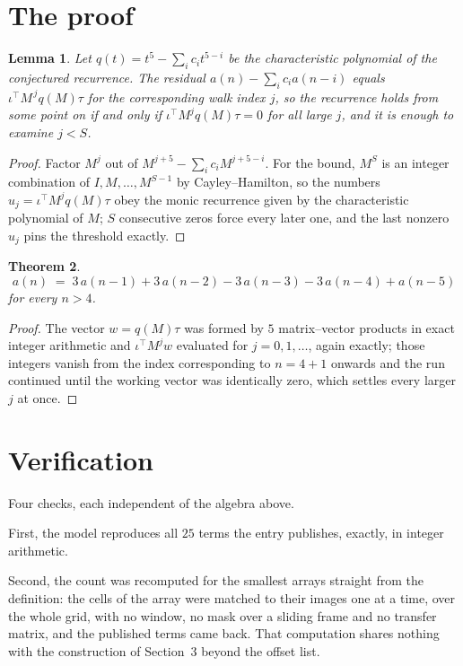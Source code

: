\documentclass[11pt,a4paper]{article}
\theoremstyle{plain}
\newtheorem{theorem}{Theorem}
\newtheorem{lemma}[theorem]{Lemma}
\theoremstyle{definition}
\begin{document}
\section{The proof}

\begin{lemma}\label{lem:crit}
Let $q(t)=t^{5}-\sum_i c_it^{5-i}$ be the characteristic polynomial of the
conjectured recurrence. The residual $a(n)-\sum_ic_ia(n-i)$ equals
$\iota^{\!\top}M^{\,j}q(M)\tau$ for the corresponding walk index $j$, so the recurrence
holds from some point on if and only if $\iota^{\!\top}M^{j}q(M)\tau=0$ for all large $j$,
and it is enough to examine $j<S$.
\end{lemma}

\begin{proof}
Factor $M^{j}$ out of $M^{j+5}-\sum_ic_iM^{j+5-i}$. For the bound, $M^{S}$
is an integer combination of $I,M,\dots,M^{S-1}$ by Cayley--Hamilton, so the numbers
$u_j=\iota^{\!\top}M^{j}q(M)\tau$ obey the monic recurrence given by the characteristic
polynomial of $M$; $S$ consecutive zeros force every later one, and the last nonzero $u_j$
pins the threshold exactly.
\end{proof}

\begin{theorem}
\[
a(n)\;=\;3\,a(n-1) + 3\,a(n-2) - 3\,a(n-3) - 3\,a(n-4) + a(n-5)
\]
for every $n>4$.
\end{theorem}

\begin{proof}
The vector $w=q(M)\tau$ was formed by $5$ matrix--vector products in exact integer
arithmetic and $\iota^{\!\top}M^{j}w$ evaluated for $j=0,1,\dots$, again exactly; those
integers vanish from the index corresponding to $n=4+1$ onwards and the run continued
until the working vector was identically zero, which settles every larger $j$ at once.
\end{proof}

\section{Verification}

Four checks, each independent of the algebra above.

First, the model reproduces all $25$ terms the entry publishes, exactly, in integer
arithmetic.

Second, the count was recomputed for the smallest arrays straight from the definition: the
cells of the array were matched to their images one at a time, over the whole grid, with no
window, no mask over a sliding frame and no transfer matrix, and the published terms came back.
That computation shares nothing with the construction of Section~3 beyond the offset list.
\end{document}
